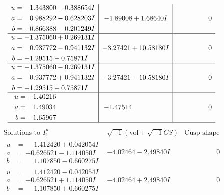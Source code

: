 \documentclass[1p]{elsarticle_modified}
\theoremstyle{definition}
\newcommand{\I}{\sqrt{-1}}
\begin{document}
$$\begin{array}{c|c|c}
\begin{aligned}
u &= \phantom{-}1.343800 - 0.388654 I \\
a &= \phantom{-}0.988292 - 0.628203 I \\
b &= -0.866388 - 0.201249 I\end{aligned}
 & -1.89008 + 1.68640 I & \phantom{-0.000000 } 0 \\ \hline\begin{aligned}
u &= -1.375060 + 0.269131 I \\
a &= \phantom{-}0.937772 - 0.941132 I \\
b &= -1.29515 - 0.75871 I\end{aligned}
 & -3.27421 + 10.58180 I & \phantom{-0.000000 } 0 \\ \hline\begin{aligned}
u &= -1.375060 - 0.269131 I \\
a &= \phantom{-}0.937772 + 0.941132 I \\
b &= -1.29515 + 0.75871 I\end{aligned}
 & -3.27421 - 10.58180 I & \phantom{-0.000000 } 0 \\ \hline\begin{aligned}
u &= -1.40216\phantom{ +0.000000I} \\
a &= \phantom{-}1.49034\phantom{ +0.000000I} \\
b &= -1.65967\phantom{ +0.000000I}\end{aligned}
 & -1.47514\phantom{ +0.000000I} & \phantom{-0.000000 } 0\\
 \hline 
 \end{array}$$\newpage$$\begin{array}{c|c|c}  
\text{Solutions to }I^u_{1}& \I (\text{vol} + \sqrt{-1}CS) & \text{Cusp shape}\\
 \hline 
\begin{aligned}
u &= \phantom{-}1.412420 + 0.042054 I \\
a &= -0.626521 - 1.114050 I \\
b &= \phantom{-}1.107850 - 0.660275 I\end{aligned}
 & -4.02464 - 2.49840 I & \phantom{-0.000000 } 0 \\ \hline\begin{aligned}
u &= \phantom{-}1.412420 - 0.042054 I \\
a &= -0.626521 + 1.114050 I \\
b &= \phantom{-}1.107850 + 0.660275 I\end{aligned}
 & -4.02464 + 2.49840 I & \phantom{-0.000000 } 0 \\ \hline\begin{aligned}

\end{aligned}
\end{array}$$
\end{document}

